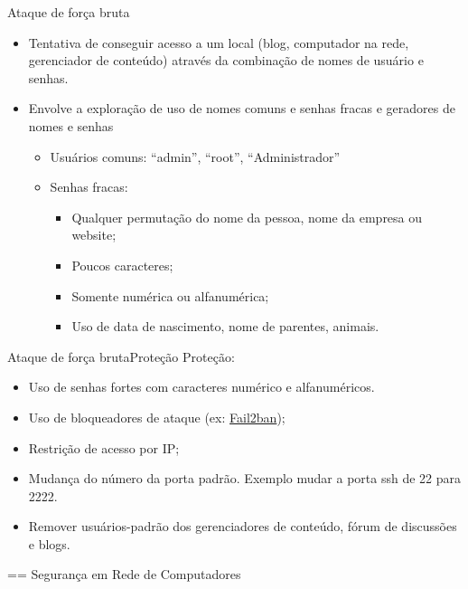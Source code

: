   
  \begin{frame}{Ataque de força bruta}
    \begin{itemize}[<+->]
    \item    Tentativa de conseguir acesso a um local (blog, computador na rede, gerenciador de conteúdo) através da combinação de nomes de usuário e senhas.
    \item Envolve a exploração de uso de nomes comuns e senhas fracas e geradores de nomes e senhas
      \begin{itemize}
      \item Usuários comuns: ``admin'', ``root'', ``Administrador''
      \item Senhas fracas:
        \begin{itemize}
        \item Qualquer permutação do nome da pessoa, nome da empresa ou website;
        \item Poucos caracteres;
        \item Somente numérica ou alfanumérica;
        \item Uso de data de nascimento,  nome de parentes, animais.
        \end{itemize}
      \end{itemize}
    \end{itemize}
  \end{frame}

  \begin{frame}{Ataque de força bruta}{Proteção}
    Proteção:\\
    \begin{itemize}[<+->]
    \item Uso de senhas fortes com caracteres numérico e alfanuméricos.
    \item Uso de bloqueadores de ataque (ex: \href{https://www.fail2ban.org/wiki/index.php/Main_Page}{Fail2ban});
    \item Restrição de acesso por IP;
    \item Mudança do número da porta padrão. Exemplo mudar a porta ssh de 22 para 2222.
    \item Remover usuários-padrão dos gerenciadores de conteúdo, fórum de discussões e blogs.
    \end{itemize}
  \end{frame}



== Segurança em Rede de Computadores

